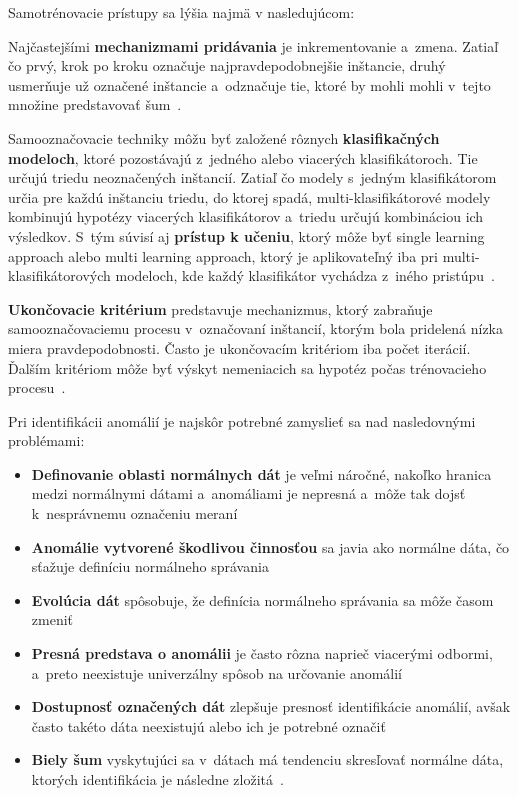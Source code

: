 \documentclass[a4paper,twoside,slovak,12pt]{article}
\begin{document}
Samotrénovacie prístupy sa lýšia najmä v nasledujúcom:

Najčastejšími \textbf{mechanizmami pridávania} je inkrementovanie a~zmena.
Zatiaľ čo prvý, krok po kroku označuje najpravdepodobnejšie inštancie, druhý
usmerňuje už označené inštancie a~odznačuje tie, ktoré by mohli mohli v~tejto
množine predstavovať šum~\cite{Gonzalez2017}.

Samooznačovacie techniky môžu byť založené rôznych
\textbf{klasifikačných modeloch}, ktoré pozostávajú z~jedného alebo viacerých
klasifikátoroch. Tie určujú triedu neoznačených inštancií. Zatiaľ čo modely
s~jedným klasifikátorom určia pre každú inštanciu triedu, do ktorej spadá,
multi-klasifikátorové modely kombinujú hypotézy viacerých klasifikátorov
a~triedu určujú kombináciou ich výsledkov. S~tým súvisí aj
\textbf{prístup k učeniu}, ktorý môže byť single learning approach alebo
multi learning approach, ktorý je aplikovateľný iba pri multi-klasifikátorových
modeloch, kde každý klasifikátor vychádza z~iného pristúpu~\cite{Gonzalez2017}.

\textbf{Ukončovacie kritérium} predstavuje mechanizmus, ktorý zabraňuje
samooznačovaciemu procesu v~označovaní inštancií, ktorým bola pridelená nízka
miera pravdepodobnosti. Často je ukončovacím kritériom iba počet iterácií.
Ďalším kritériom môže byť výskyt nemeniacich sa hypotéz počas trénovacieho
procesu~\cite{Gonzalez2017}.

Pri identifikácii anomálií je najskôr potrebné zamyslieť sa nad nasledovnými
problémami:

\begin{itemize}[noitemsep]
\item \textbf{Definovanie oblasti normálnych dát} je veľmi náročné, nakoľko
hranica medzi normálnymi dátami a~anomáliami je nepresná a~môže tak dojsť
k~nesprávnemu označeniu meraní
\item \textbf{Anomálie vytvorené škodlivou činnosťou} sa javia ako normálne
dáta, čo sťažuje definíciu normálneho správania
\item \textbf{Evolúcia dát} spôsobuje, že definícia normálneho správania sa môže
časom zmeniť
\item \textbf{Presná predstava o anomálii} je často rôzna naprieč viacerými
odbormi, a~preto neexistuje univerzálny spôsob na určovanie anomálií
\item \textbf{Dostupnosť označených dát} zlepšuje presnosť identifikácie anomálií,
avšak často takéto dáta neexistujú alebo ich je potrebné označiť
\item \textbf{Biely šum} vyskytujúci sa v~dátach má tendenciu skresľovať
normálne dáta, ktorých identifikácia je následne zložitá~\cite{Chandola2009}.
\end{itemize}
\end{document}
